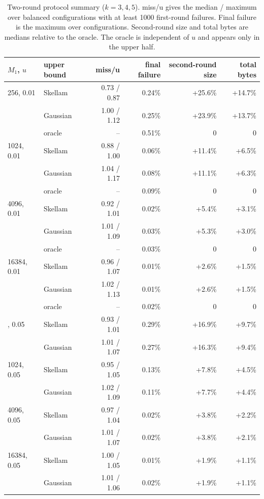 \begin{table}[!htbp]
\centering
\caption{Two-round protocol summary ($k=3,4,5$). miss/u gives the median / maximum over balanced configurations with at least 1000 first-round failures. Final failure is the maximum over configurations. Second-round size and total bytes are medians relative to the oracle. The oracle is independent of $u$ and appears only in the upper half.}
\label{tab:e2e}
\begin{tabular}{@{}llrrrr@{}}
\toprule
$M_1$, $u$ & upper bound & miss/u & final failure & second-round size & total bytes\\
\midrule
256, 0.01 & Skellam & 0.73 / 0.87 & 0.24\% & +25.6\% & +14.7\%\\
& Gaussian & 1.00 / 1.12 & 0.25\% & +23.9\% & +13.7\%\\
& oracle & -- & 0.51\% & 0 & 0\\
1024, 0.01 & Skellam & 0.88 / 1.00 & 0.06\% & +11.4\% & +6.5\%\\
& Gaussian & 1.04 / 1.17 & 0.08\% & +11.1\% & +6.3\%\\
& oracle & -- & 0.09\% & 0 & 0\\
4096, 0.01 & Skellam & 0.92 / 1.01 & 0.02\% & +5.4\% & +3.1\%\\
& Gaussian & 1.01 / 1.09 & 0.03\% & +5.3\% & +3.0\%\\
& oracle & -- & 0.03\% & 0 & 0\\
16384, 0.01 & Skellam & 0.96 / 1.07 & 0.01\% & +2.6\% & +1.5\%\\
& Gaussian & 1.02 / 1.13 & 0.01\% & +2.6\% & +1.5\%\\
& oracle & -- & 0.02\% & 0 & 0\\
\addlinespace
256, 0.05 & Skellam & 0.93 / 1.01 & 0.29\% & +16.9\% & +9.7\%\\
& Gaussian & 1.01 / 1.07 & 0.27\% & +16.3\% & +9.4\%\\
1024, 0.05 & Skellam & 0.95 / 1.05 & 0.13\% & +7.8\% & +4.5\%\\
& Gaussian & 1.02 / 1.09 & 0.11\% & +7.7\% & +4.4\%\\
4096, 0.05 & Skellam & 0.97 / 1.04 & 0.02\% & +3.8\% & +2.2\%\\
& Gaussian & 1.01 / 1.07 & 0.02\% & +3.8\% & +2.1\%\\
16384, 0.05 & Skellam & 1.00 / 1.05 & 0.01\% & +1.9\% & +1.1\%\\
& Gaussian & 1.01 / 1.06 & 0.02\% & +1.9\% & +1.1\%\\
\bottomrule
\end{tabular}
\end{table}

